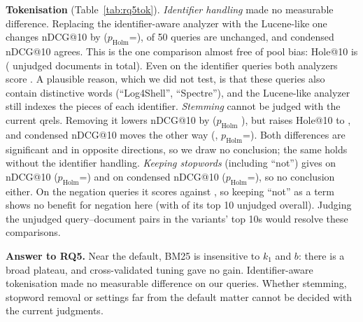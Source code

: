 \documentclass[10pt,a4paper]{article}
\begin{document}
\textbf{Tokenisation} (Table~\ref{tab:rq5tok}). \emph{Identifier handling} made no measurable difference.
Replacing the identifier-aware analyzer with the Lucene-like one changes nDCG@10 by \rqPlainDiff{}
($p_{\text{Holm}}$=\rqPlainP), \rqPlainTies{} of 50 queries are unchanged, and condensed nDCG@10 agrees.
This is the one comparison almost free of pool bias: Hole@10 is \rqPlainHole{} (\rqPlainUnjudged{}
unjudged documents in total). Even on the identifier queries both analyzers score \rqIdIdent. A plausible
reason, which we did not test, is that these queries also contain distinctive words (``Log4Shell'',
``Spectre''), and the Lucene-like analyzer still indexes the pieces of each identifier.
\emph{Stemming} cannot be judged with the current qrels. Removing it lowers nDCG@10 by \rqNostemDiff{}
($p_{\text{Holm}}$ \rqNostemP), but raises Hole@10 to \rqNostemHole, and condensed nDCG@10 moves the other
way (\rqNostemCDiff, $p_{\text{Holm}}$=\rqNostemCP). Both differences are significant and in opposite
directions, so we draw no conclusion; the same holds without the identifier handling.
\emph{Keeping stopwords} (including ``not'') gives \rqNostopDiff{} on nDCG@10 ($p_{\text{Holm}}$=\rqNostopP)
and \rqNostopCDiff{} on condensed nDCG@10 ($p_{\text{Holm}}$=\rqNostopCP), so no conclusion either. On the
negation queries it scores \rqNostopNeg{} against \rqIdNeg, so keeping ``not'' as a term shows no benefit
for negation here (with \rqNostopHole{} of its top 10 unjudged overall). Judging the \rqUnjudgedUnion{} unjudged query--document pairs in the variants' top
10s would resolve these comparisons.

\textbf{Answer to RQ5.} Near the default, BM25 is insensitive to $k_1$ and $b$: there is a broad plateau,
and cross-validated tuning gave no gain. Identifier-aware tokenisation made no measurable difference on
our queries. Whether stemming, stopword removal or settings far from the default matter cannot be decided
with the current judgments.

\FloatBarrier
\end{document}
